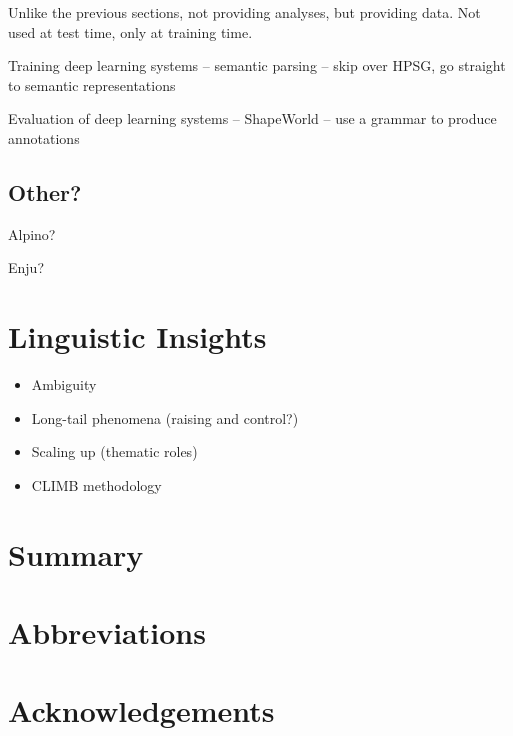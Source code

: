 \documentclass[output=paper]{langsci/langscibook}
\begin{document}
Unlike the previous sections,
not providing analyses, but providing data.
Not used at test time, only at training time.

Training deep learning systems
-- semantic parsing
-- skip over HPSG, go straight to semantic representations

Evaluation of deep learning systems
-- ShapeWorld
-- use a grammar to produce annotations


\subsection{Other?}

Alpino?

Enju?



\section{Linguistic Insights}
\label{cl:insight}

\begin{itemize}
    \item Ambiguity %
    \item Long-tail phenomena (raising and control?) %
    \item Scaling up (thematic roles) %
    \item CLIMB methodology %
\end{itemize}

\section{Summary}

\section*{Abbreviations}
\section*{Acknowledgements}

\printbibliography[heading=subbibliography,notkeyword=this] 
\end{document}
